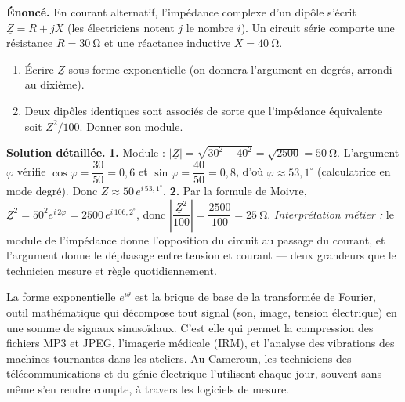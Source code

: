\documentclass[11pt]{article}
\newcommand{\cle}[1]{{\popxbold\color{popdark}#1}}
\begin{document}
\begin{exoresolu}
\textbf{Énoncé.} En courant alternatif, l'impédance complexe d'un dipôle s'écrit $\underline{Z} = R + jX$ (les électriciens notent $j$ le nombre $i$). Un circuit série comporte une résistance $R = \SI{30}{\ohm}$ et une réactance inductive $X = \SI{40}{\ohm}$.
\begin{enumerate}
  \item Écrire $\underline{Z}$ sous forme exponentielle (on donnera l'argument en degrés, arrondi au dixième).
  \item Deux dipôles identiques sont associés de sorte que l'impédance équivalente soit $\underline{Z}^2 / 100$. Donner son module.
\end{enumerate}
\tcblower
\textbf{Solution détaillée.}
\textbf{1.} Module : $|\underline{Z}| = \sqrt{30^2 + 40^2} = \sqrt{2500} = \SI{50}{\ohm}$. L'argument $\varphi$ vérifie $\cos\varphi = \dfrac{30}{50} = 0{,}6$ et $\sin\varphi = \dfrac{40}{50} = 0{,}8$, d'où $\varphi \approx 53{,}1^\circ$ (calculatrice en mode degré). Donc $\underline{Z} \approx 50\,e^{i\,53{,}1^\circ}$.
\textbf{2.} Par la formule de Moivre, $\underline{Z}^2 = 50^2 e^{i\,2\varphi} = 2500\,e^{i\,106{,}2^\circ}$, donc $\left|\dfrac{\underline{Z}^2}{100}\right| = \dfrac{2500}{100} = \SI{25}{\ohm}$.
\textit{Interprétation métier :} le module de l'impédance donne l'opposition du circuit au passage du courant, et l'argument donne le déphasage entre tension et courant — deux grandeurs que le technicien mesure et règle quotidiennement.
\end{exoresolu}

\begin{savaistu}
La forme exponentielle $e^{i\theta}$ est la brique de base de la \cle{transformée de Fourier}, outil mathématique qui décompose tout signal (son, image, tension électrique) en une somme de signaux sinusoïdaux. C'est elle qui permet la compression des fichiers MP3 et JPEG, l'imagerie médicale (IRM), et l'analyse des vibrations des machines tournantes dans les ateliers. Au Cameroun, les techniciens des télécommunications et du génie électrique l'utilisent chaque jour, souvent sans même s'en rendre compte, à travers les logiciels de mesure.
\end{savaistu}
\end{document}
